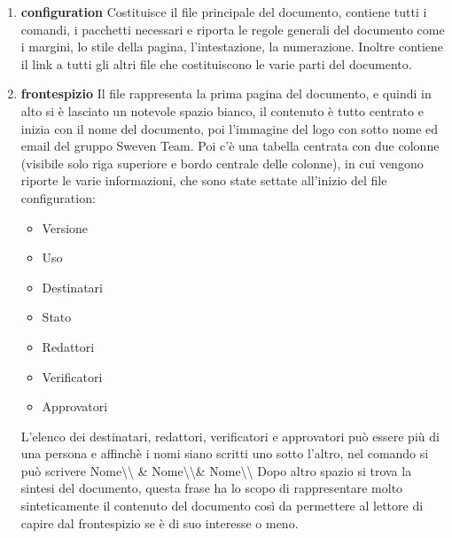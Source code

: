 \begin{enumerate}
    \item \textbf{configuration}
            Costituisce il file principale del documento, contiene tutti i comandi, 
            i pacchetti necessari e riporta le regole generali del documento come 
            i margini, lo stile della pagina, l'intestazione, la numerazione. 
            Inoltre contiene il link a tutti gli altri file che costituiscono le 
            varie parti del documento.

    \item \textbf{frontespizio}
            Il file rappresenta la prima pagina del documento, e quindi in alto si
            è lasciato un notevole spazio bianco, il contenuto è tutto centrato e 
            inizia con il nome del documento, poi l'immagine del logo con sotto 
            nome ed email del gruppo Sweven Team. Poi c'è una tabella centrata 
            con due colonne (visibile solo riga superiore e bordo centrale delle colonne), 
            in cui vengono riporte le varie informazioni, che sono state settate all'inizio 
            del file configuration:
            \begin{itemize}
                \item Versione
                \item Uso
                \item Destinatari
                \item Stato
                \item Redattori
                \item Verificatori
                \item Approvatori
            \end{itemize}
            L'elenco dei destinatari, redattori, verificatori e approvatori 
            può essere più di una persona e affinchè i nomi siano scritti uno sotto 
            l'altro, nel comando si può scrivere Nome\textbackslash\textbackslash 
            \& Nome\textbackslash\textbackslash \& Nome\textbackslash\textbackslash
            \newline Dopo altro spazio si trova la sintesi del documento, questa frase
            ha lo scopo di rappresentare molto sinteticamente il contenuto del documento 
            così da permettere al lettore di capire dal frontespizio se è di suo interesse
            o meno.
    

\end{enumerate}
